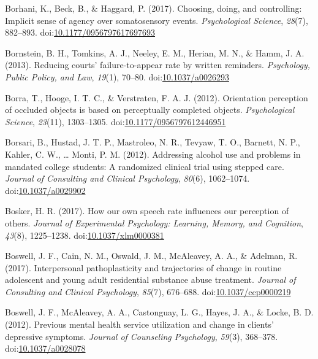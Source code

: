 \documentclass[english,man]{apa6}
\theoremstyle{definition}
\theoremstyle{definition}
\theoremstyle{definition}
\theoremstyle{remark}
\begin{document}
\hypertarget{ref-Borhani2017}{}
Borhani, K., Beck, B., \& Haggard, P. (2017). Choosing, doing, and
controlling: Implicit sense of agency over somatosensory events.
\emph{Psychological Science}, \emph{28}(7), 882--893.
doi:\href{https://doi.org/10.1177/0956797617697693}{10.1177/0956797617697693}

\hypertarget{ref-Bornstein2013}{}
Bornstein, B. H., Tomkins, A. J., Neeley, E. M., Herian, M. N., \& Hamm,
J. A. (2013). Reducing courts' failure-to-appear rate by written
reminders. \emph{Psychology, Public Policy, and Law}, \emph{19}(1),
70--80. doi:\href{https://doi.org/10.1037/a0026293}{10.1037/a0026293}

\hypertarget{ref-Borra2012}{}
Borra, T., Hooge, I. T. C., \& Verstraten, F. A. J. (2012). Orientation
perception of occluded objects is based on perceptually completed
objects. \emph{Psychological Science}, \emph{23}(11), 1303--1305.
doi:\href{https://doi.org/10.1177/0956797612446951}{10.1177/0956797612446951}

\hypertarget{ref-Borsari2012}{}
Borsari, B., Hustad, J. T. P., Mastroleo, N. R., Tevyaw, T. O., Barnett,
N. P., Kahler, C. W., \ldots{} Monti, P. M. (2012). Addressing alcohol
use and problems in mandated college students: A randomized clinical
trial using stepped care. \emph{Journal of Consulting and Clinical
Psychology}, \emph{80}(6), 1062--1074.
doi:\href{https://doi.org/10.1037/a0029902}{10.1037/a0029902}

\hypertarget{ref-Bosker2017}{}
Bosker, H. R. (2017). How our own speech rate influences our perception
of others. \emph{Journal of Experimental Psychology: Learning, Memory,
and Cognition}, \emph{43}(8), 1225--1238.
doi:\href{https://doi.org/10.1037/xlm0000381}{10.1037/xlm0000381}

\hypertarget{ref-Boswell2017a}{}
Boswell, J. F., Cain, N. M., Oswald, J. M., McAleavey, A. A., \&
Adelman, R. (2017). Interpersonal pathoplasticity and trajectories of
change in routine adolescent and young adult residential substance abuse
treatment. \emph{Journal of Consulting and Clinical Psychology},
\emph{85}(7), 676--688.
doi:\href{https://doi.org/10.1037/ccp0000219}{10.1037/ccp0000219}

\hypertarget{ref-Boswell2012}{}
Boswell, J. F., McAleavey, A. A., Castonguay, L. G., Hayes, J. A., \&
Locke, B. D. (2012). Previous mental health service utilization and
change in clients' depressive symptoms. \emph{Journal of Counseling
Psychology}, \emph{59}(3), 368--378.
doi:\href{https://doi.org/10.1037/a0028078}{10.1037/a0028078}
\end{document}
